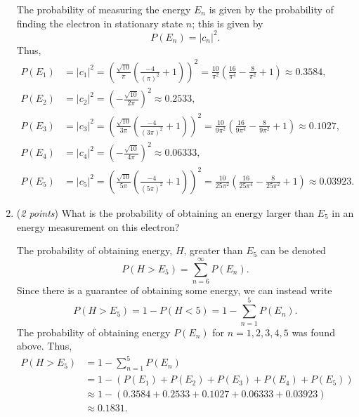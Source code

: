 \documentclass[a4paper, 12pt]{config/homework}
\begin{document}
\begin{enumerate}[label=(\alph*)]
The probability of measuring the energy \(E_n\) is given by the probability of finding the electron in stationary state \(n\); this is given by
\[P(E_n) = \left|c_n\right|^2.\]
Thus,
\begin{align*}
P(E_1) &= \left|c_1\right|^2
= \left(\frac{\sqrt{10}}{\pi}\left(\frac{-4}{(\pi)^2}+1\right)\right)^2
= \frac{10}{\pi^2}\left(\frac{16}{\pi^4} - \frac{8}{\pi^2} + 1\right)
\approx 0.3584,
\\P(E_2) &= \left|c_2\right|^2
= \left(-\frac{\sqrt{10}}{2\pi}\right)^2
\approx 0.2533,
\\P(E_3) &= \left|c_3\right|^2
= \left(\frac{\sqrt{10}}{3\pi}\left(\frac{-4}{(3\pi)^2}+1\right)\right)^2
= \frac{10}{9\pi^2}\left(\frac{16}{9\pi^4} - \frac{8}{9\pi^2} + 1\right)
\approx 0.1027,
\\P(E_4) &= \left|c_4\right|^2
= \left(-\frac{\sqrt{10}}{4\pi}\right)^2
\approx 0.06333,
\\P(E_5) &= \left|c_5\right|^2
= \left(\frac{\sqrt{10}}{5\pi}\left(\frac{-4}{(5\pi)^2}+1\right)\right)^2
= \frac{10}{25\pi^2}\left(\frac{16}{25\pi^4} - \frac{8}{25\pi^2} + 1\right)
\approx 0.03923.
\end{align*}

\pagebreak
\item (\textit{2 points}) What is the probability of obtaining an energy larger than \(E_5\) in an energy measurement on this electron?

The probability of obtaining energy, \(H\), greater than \(E_5\) can be denoted
\[P(H > E_5) = \sum_{n=6}^{\infty}{P(E_n)}.\]
Since there is a guarantee of obtaining some energy, we can instead write
\[P(H > E_5) = 1 - P(H < 5) = 1 - \sum_{n=1}^{5}{P(E_n)}.\]
The probability of obtaining energy \(P(E_n)\) for \(n=1,2,3,4,5\) was found above. Thus,
\begin{align*}
P(H > E_5) &= 1 - \sum_{n=1}^{5}{P(E_n)}
\\&= 1 - \left(P(E_1) + P(E_2) + P(E_3) + P(E_4) + P(E_5)\right)
\\&\approx 1 - \left( 0.3584 + 0.2533 + 0.1027 + 0.06333 + 0.03923\right)
\\&\approx 0.1831.
\end{align*}

\end{enumerate}
\end{document}
